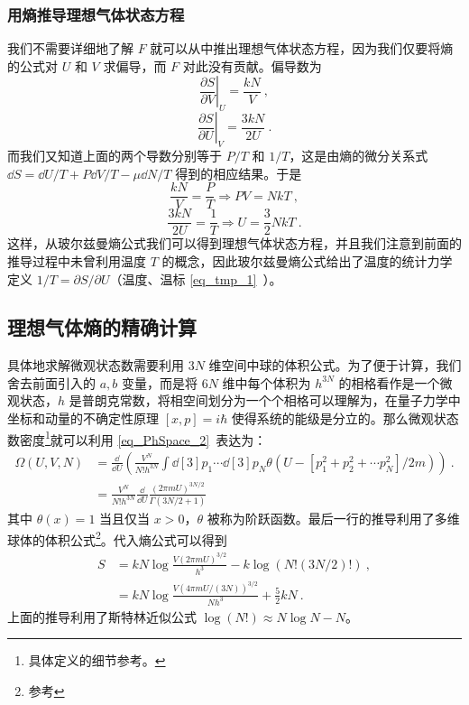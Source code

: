 \subsubsection{用熵推导理想气体状态方程}
我们不需要详细地了解 $F$ 就可以从中推出理想气体状态方程，因为我们仅要将熵的公式对 $U $ 和 $V$ 求偏导，而 $F$ 对此没有贡献。偏导数为
\begin{equation}
\left. \frac{\partial S}{\partial V} \right |_{U}^{}=\frac{kN}{V}~,
\end{equation}
\begin{equation}
\left. \frac{\partial S}{\partial U}\right |_{V}^{}=\frac{3kN}{2U}~.
\end{equation}
而我们又知道上面的两个导数分别等于 $P/T$ 和 $1/T$，这是由熵的微分关系式 $\dd S=\dd U/T+P\dd V/T-\mu \dd N/T$ 得到的相应结果。于是
\begin{equation}
\dfrac{kN}{V}=\dfrac{P}{T}\Rightarrow PV=NkT~,
\end{equation}
\begin{equation}
\dfrac{3kN}{2U} = \dfrac{1}{T}\Rightarrow U=\frac{3}{2}NkT~.
\end{equation}
这样，从玻尔兹曼熵公式我们可以得到理想气体状态方程，并且我们注意到前面的推导过程中未曾利用温度 $T$ 的概念，因此玻尔兹曼熵公式给出了温度的统计力学定义 $1/T=\partial S/\partial U$（温度、温标 \autoref{eq_tmp_1}~）。
\subsection{理想气体熵的精确计算}
具体地求解微观状态数需要利用 $3N$ 维空间中球的体积公式。为了便于计算，我们舍去前面引入的 $a,b$ 变量，而是将 $6N$ 维中每个体积为 $h^{3N}$ 的相格看作是一个微观状态，$h$ 是普朗克常数，将相空间划分为一个个相格可以理解为，在量子力学中坐标和动量的不确定性原理 $[x,p]=i\hbar$ 使得系统的能级是分立的。那么微观状态数密度\footnote{具体定义的细节参考。}就可以利用 \autoref{eq_PhSpace_2}~表达为：
\begin{equation}
\begin{aligned}
\Omega(U,V,N)&=\frac{\dd }{\dd U}\left(\frac{V^N}{N! h^{3N}}\int \dd[3]{p_1}\cdots \dd[3]{p_N} \theta(U-[p_1^2+p_2^2+\cdots p_N^2]/2m)\right) ~.
\\
&=\frac{V^N}{N! h^{3N}} \frac{\dd}{\dd U} \frac{(2\pi m U)^{3N/2}}{\Gamma(3N/2+1)}
\end{aligned}
\end{equation}
其中 $\theta(x)=1$ 当且仅当 $x>0$，$\theta$ 被称为阶跃函数。最后一行的推导利用了多维球体的体积公式\footnote{参考}。代入熵公式可以得到
\begin{equation}
\begin{aligned}
S&=kN\log \frac{V(2\pi mU)^{3/2}}{h^3}-k\log (N! (3N/2)!)~,
\\
&=kN\log \frac{V(4\pi m U/(3N))^{3/2}}{Nh^3}+\frac{5}{2}kN ~.
\end{aligned}
\end{equation}
上面的推导利用了斯特林近似公式 $\log(N!)\approx N\log N-N$。


